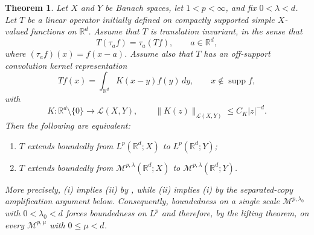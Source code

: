 \documentclass[10pt,a4paper]{amsart}
\newtheorem{theorem}{Theorem}
\newcommand{\R}{\mathbb R}
\begin{document}
\begin{theorem}\label{thm:morrey-lp-equivalence-cz}
		Let $X$ and $Y$ be Banach spaces, let $1<p<\infty$, and fix $0<\lambda<d$.  Let $T$ be a linear operator initially defined on compactly supported simple $X$-valued functions on $\R^d$.  Assume that $T$ is translation invariant, in the sense that
		\[
		T(\tau_a f)=\tau_a(Tf),\qquad a\in\R^d,
		\]
		where $(\tau_a f)(x)=f(x-a)$.  Assume also that $T$ has an off-support convolution kernel representation
		\[
		Tf(x)=\int_{\R^d}K(x-y)f(y)\,dy,
		\qquad x\notin \operatorname{supp}f,
		\]
		with
		\[
		K:\R^d\setminus\{0\}\to\mathcal L(X,Y),
		\qquad
		\|K(z)\|_{\mathcal L(X,Y)}\le C_K |z|^{-d}.
		\]
		Then the following are equivalent:
		\begin{enumerate}[label=\textup{(\roman*)}]
			\item $T$ extends boundedly from $L^p(\R^d;X)$ to $L^p(\R^d;Y)$;
			\item $T$ extends boundedly from $\mathcal M^{p,\lambda}(\R^d;X)$ to $\mathcal M^{p,\lambda}(\R^d;Y)$.
		\end{enumerate}
		More precisely, \textup{(i)} implies \textup{(ii)} by , while \textup{(ii)} implies \textup{(i)} by the separated-copy amplification argument below. Consequently, boundedness on a single scale $\mathcal M^{p,\lambda_0}$ with $0<\lambda_0<d$ forces boundedness on $L^p$ and therefore, by the lifting theorem, on every $\mathcal M^{p,\mu}$ with $0\le\mu<d$.
	\end{theorem}
\end{document}
